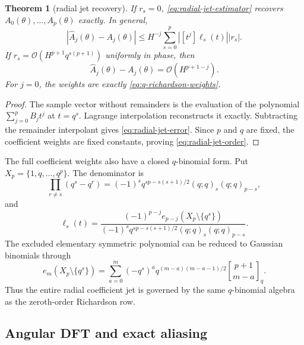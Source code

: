 \documentclass[11pt,oneside]{article}
\numberwithin{equation}{section}
\newtheorem{theorem}{Theorem}[section]
\theoremstyle{definition}
\theoremstyle{remark}
\newcommand{\bigO}{\mathcal O}
\newcommand{\qbinom}[3]{\genfrac{[}{]}{0pt}{}{#1}{#2}_{#3}}
\begin{document}
\begin{theorem}[radial jet recovery]
\label{thm:radial-jet}
If $r_s=0$, \eqref{eq:radial-jet-estimator} recovers
$A_0(\theta),\ldots,A_p(\theta)$ exactly.  In general,
\begin{equation}
 |\widehat A_j(\theta)-A_j(\theta)|
 \le H^{-j}\sum_{s=0}^{p}
 \left|[t^j]\ell_s(t)\right||r_s|.
 \label{eq:radial-jet-error}
\end{equation}
If $r_s=\bigO(H^{p+1}q^{s(p+1)})$ uniformly in phase, then
\begin{equation}
 \widehat A_j(\theta)-A_j(\theta)=\bigO(H^{p+1-j}).
 \label{eq:radial-jet-order}
\end{equation}
For $j=0$, the weights are exactly \eqref{eq:q-richardson-weights}.
\end{theorem}

\begin{proof}
The sample vector without remainders is the evaluation of the polynomial
$\sum_{j=0}^{p}B_jt^j$ at $t=q^s$.  Lagrange interpolation reconstructs it exactly.
Subtracting the remainder interpolant gives \eqref{eq:radial-jet-error}.  Since $p$ and
$q$ are fixed, the coefficient weights are fixed constants, proving
\eqref{eq:radial-jet-order}.
\end{proof}

The full coefficient weights also have a closed $q$-binomial form.  Put
$X_p=\{1,q,\ldots,q^p\}$.  The denominator is
\begin{equation}
 \prod_{r\ne s}(q^s-q^r)
 =(-1)^sq^{sp-s(s+1)/2}(q;q)_s(q;q)_{p-s},
 \label{eq:lagrange-denominator}
\end{equation}
and
\begin{equation}
 [t^j]\ell_s(t)
 =\frac{(-1)^{p-j}e_{p-j}(X_p\setminus\{q^s\})}
 {(-1)^sq^{sp-s(s+1)/2}(q;q)_s(q;q)_{p-s}}.
 \label{eq:jet-q-weights}
\end{equation}
The excluded elementary symmetric polynomial can be reduced to Gaussian binomials through
\begin{equation}
 e_m(X_p\setminus\{q^s\})
 =\sum_{a=0}^{m}(-q^s)^a
 q^{(m-a)(m-a-1)/2}\qbinom{p+1}{m-a}{q}.
 \label{eq:excluded-e-qbinom}
\end{equation}
Thus the entire radial coefficient jet is governed by the same $q$-binomial algebra as the
zeroth-order Richardson row.

\subsection{Angular DFT and exact aliasing}
\end{document}
